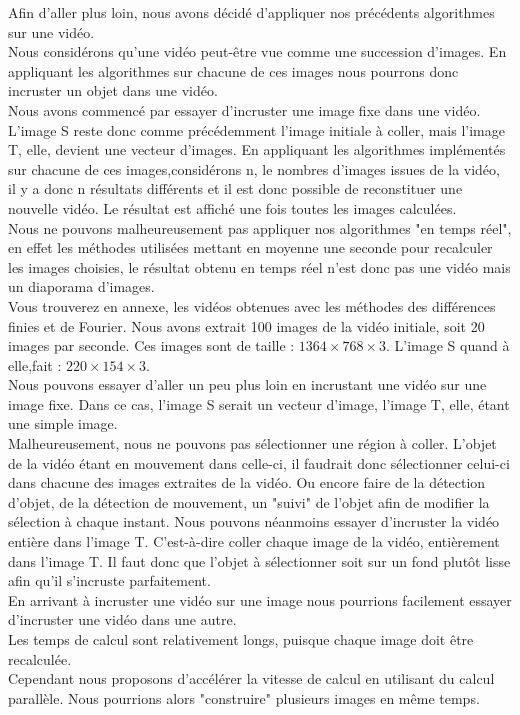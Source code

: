 Afin d'aller plus loin, nous avons décidé d'appliquer nos précédents algorithmes sur une vidéo. \\
Nous considérons qu'une vidéo peut-être vue comme une succession d'images. En appliquant les algorithmes sur chacune de ces images nous pourrons donc incruster un objet dans une vidéo. \\
Nous avons commencé par essayer d'incruster une image fixe dans une vidéo. 
L'image S reste donc comme précédemment l'image initiale à coller, mais l'image T, elle, devient une vecteur d'images. En appliquant les algorithmes implémentés sur chacune de ces images,considérons n, le nombres d'images issues de la vidéo, il y a donc n résultats différents et il est donc possible de reconstituer une nouvelle vidéo.  Le résultat est affiché une fois toutes les images calculées. \\ 
Nous ne pouvons malheureusement pas appliquer nos algorithmes "en temps réel", en effet les méthodes utilisées mettant  en moyenne une seconde pour recalculer les images choisies, le résultat obtenu en temps réel n'est donc pas une vidéo mais un diaporama d'images. \\
Vous trouverez en annexe, les vidéos obtenues avec les méthodes des différences finies et de Fourier. 
Nous avons extrait 100 images de la vidéo initiale, soit 20 images par seconde. Ces images sont de taille : $1364 \times 768 \times 3$.  L'image S quand à elle,fait : $220 \times 154 \times 3$.\\
Nous pouvons essayer d'aller un peu plus loin en incrustant une vidéo sur une image fixe. Dans ce cas, l'image S serait un vecteur d'image, l'image T, elle, étant une simple image. \\ Malheureusement, nous ne pouvons pas sélectionner une région à coller. L'objet de la vidéo étant en mouvement dans celle-ci, il faudrait donc sélectionner celui-ci dans chacune des images extraites de la vidéo. Ou encore faire de la détection d'objet, de la détection de mouvement, un "suivi" de l'objet afin de modifier la sélection à chaque instant. Nous pouvons néanmoins essayer d'incruster la vidéo entière dans l'image T.  C'est-à-dire coller chaque image de la vidéo, entièrement dans l'image T. Il faut donc que l'objet à sélectionner soit sur un fond plutôt lisse afin qu'il s'incruste parfaitement. \\
En arrivant à incruster une vidéo sur une image nous pourrions facilement essayer d'incruster une vidéo dans une autre. \\
Les temps de calcul sont relativement longs, puisque chaque image doit être recalculée. \\
Cependant nous proposons d'accélérer la vitesse de calcul en utilisant du calcul parallèle. Nous pourrions alors "construire" plusieurs images en même temps.\\
